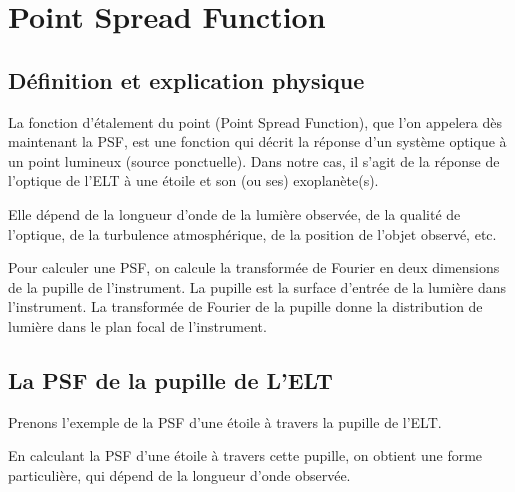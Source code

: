 \newpage
\section{\centering Point Spread Function}

\subsection{Définition et explication physique}

La fonction d'étalement du point (Point Spread Function), que l'on appelera dès maintenant la PSF, est une fonction qui décrit la réponse d'un système optique à un point lumineux (source ponctuelle). Dans notre cas, il s'agit de la réponse de l'optique de l'ELT à une étoile et son (ou ses) exoplanète(s).

Elle dépend de la longueur d'onde de la lumière observée, de la qualité de l'optique, de la turbulence atmosphérique, de la position de l'objet observé, etc.

Pour calculer une PSF, on calcule la transformée de Fourier en deux dimensions de la pupille de l'instrument. La pupille est la surface d'entrée de la lumière dans l'instrument. La transformée de Fourier de la pupille donne la distribution de lumière dans le plan focal de l'instrument.


\subsection{La PSF de la pupille de L’ELT}

Prenons l'exemple de la PSF d'une étoile à travers la pupille de l'ELT.


En calculant la PSF d'une étoile à travers cette pupille, on obtient une forme particulière, qui dépend de la longueur d'onde observée.

